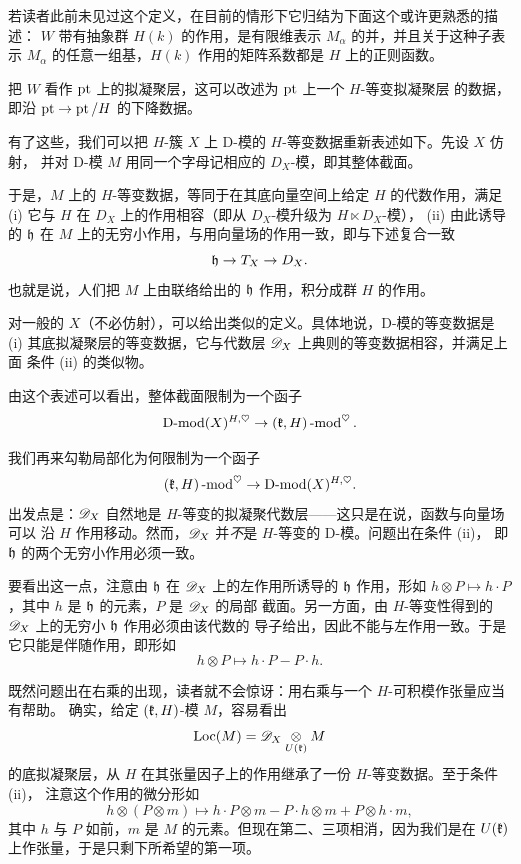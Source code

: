 \begin{re}若读者此前未见过这个定义，在目前的情形下它归结为下面这个或许更熟悉的描述：
$W$ 带有抽象群 $H(k)$ 的作用，是有限维表示 $M_\alpha$ 的并，并且关于这种子表示
$M_\alpha$ 的任意一组基，$H(k)$ 作用的矩阵系数都是 $H$ 上的正则函数。
\end{re}

把 $W$ 看作 $\operatorname{pt}$ 上的拟凝聚层，这可以改述为 $\operatorname{pt}$ 上一个 $H$-等变拟凝聚层
的数据，即沿 $\operatorname{pt} \rightarrow \operatorname{pt}/H$ 的下降数据。

有了这些，我们可以把 $H$-簇 $X$ 上 D-模的 $H$-等变数据重新表述如下。先设 $X$ 仿射，
并对 D-模 $M$ 用同一个字母记相应的 $D_X$-模，即其整体截面。

于是，$M$ 上的 $H$-等变数据，等同于在其底向量空间上给定 $H$ 的代数作用，满足
(i) 它与 $H$ 在 $D_X$ 上的作用相容（即从 $D_X$-模升级为 $H \ltimes D_X$-模），
(ii) 由此诱导的 $\mathfrak{h}$ 在 $M$ 上的无穷小作用，与用向量场的作用一致，即与下述复合一致
%
\begin{equation} \label{e:hch}
\mathfrak{h} \rightarrow T_X \rightarrow D_X.
\end{equation}
%
也就是说，人们把 $M$ 上由联络给出的 $\mathfrak{h}$ 作用，积分成群 $H$ 的作用。

对一般的 $X$（不必仿射），可以给出类似的定义。具体地说，D-模的等变数据是
(i) 其底拟凝聚层的等变数据，它与代数层 $\mathscr{D}_X$ 上典则的等变数据相容，并满足上面
条件 (ii) 的类似物。

\ssszh 由这个表述可以看出，整体截面限制为一个函子
%
\[
         \operatorname{D-mod}(X)^{H, \heartsuit} \rightarrow (\mathfrak{k}, H)\operatorname{-mod}^\heartsuit.
\]
%

我们再来勾勒局部化为何限制为一个函子
%
\[
   (\mathfrak{k}, H)\operatorname{-mod}^\heartsuit \rightarrow \operatorname{D-mod}(X)^{H, \heartsuit}.
\]
%
出发点是：$\mathscr{D}_X$ 自然地是 $H$-等变的拟凝聚代数层——这只是在说，函数与向量场可以
沿 $H$ 作用移动。然而，$\mathscr{D}_X$ 并\emph{不}是 $H$-等变的 D-模。问题出在条件 (ii)，
即 $\mathfrak{h}$ 的两个无穷小作用必须一致。

要看出这一点，注意由 $\mathfrak{h}$ 在 $\mathscr{D}_X$ 上的左作用所诱导的 $\mathfrak{h}$ 作用，形如
$h \otimes P \mapsto h \cdot P$，其中 $h$ 是 $\mathfrak{h}$ 的元素，$P$ 是 $\mathscr{D}_X$ 的局部
截面。另一方面，由 $H$-等变性得到的 $\mathscr{D}_X$ 上的无穷小 $\mathfrak{h}$ 作用必须由该代数的
导子给出，因此不能与左作用一致。于是它只能是伴随作用，即形如
%
\[
     h \otimes P \mapsto h\cdot P - P\cdot h.
\]
%

既然问题出在右乘的出现，读者就不会惊讶：用右乘与一个 $H$-可积模作张量应当有帮助。
确实，给定 $(\mathfrak{k}, H)$-模 $M$，容易看出
%
\begin{equation*}
\operatorname{Loc}(M) = \mathscr{D}_X \underset{U(\mathfrak{k})} \otimes M
\end{equation*}
%
的底拟凝聚层，从 $H$ 在其张量因子上的作用继承了一份 $H$-等变数据。至于条件 (ii)，
注意这个作用的微分形如
%
\[
          h \otimes (P \otimes m) \mapsto h \cdot P \otimes m - P \cdot h
          \otimes m + P \otimes h \cdot m,
\]
%
其中 $h$ 与 $P$ 如前，$m$ 是 $M$ 的元素。但现在第二、三项相消，因为我们是在
$U(\mathfrak{k})$ 上作张量，于是只剩下所希望的第一项。
